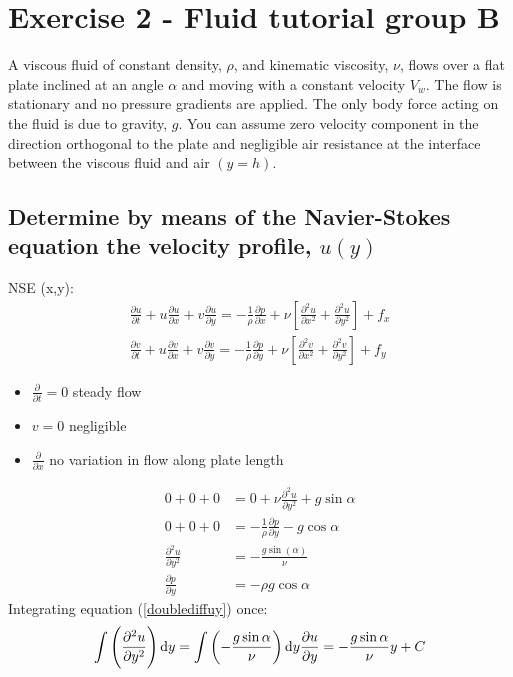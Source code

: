 \documentclass[class=report, crop=false, 12pt,a4paper]{standalone}
\begin{document}
\section{Exercise 2 - Fluid tutorial group B}
A viscous fluid of constant density, $\rho$, and kinematic viscosity, $\nu$, flows over a flat plate inclined at an angle $\alpha$ and moving with a constant velocity $V_w$. The flow is stationary and no pressure gradients are applied. The only body force acting on the fluid is due to gravity, $g$. You can assume zero velocity component in the direction orthogonal to the plate and negligible air resistance at the interface between the viscous fluid and air $(y = h)$.
\subsection{Determine by means of the Navier-Stokes equation the velocity profile, $u(y)$}
NSE (x,y):
\begin{gather}
  \frac{\partial u}{\partial t} + u \frac{\partial u}{\partial x} + v\frac{\partial u}{\partial y} = -\frac{1}{\rho}\frac{\partial p}{\partial x} +\nu \left[ \frac{\partial^2 u}{\partial x^2} +\frac{\partial^2 u}{\partial y^2} \right] + f_x\\
  \frac{\partial v}{\partial t} + u \frac{\partial v}{\partial x} + v\frac{\partial v}{\partial y} = -\frac{1}{\rho} \frac{\partial p}{\partial y} +\nu \left[ \frac{\partial^2 v}{\partial x^2} +\frac{\partial^2 v}{\partial y^2} \right] + f_y
\end{gather}
\begin{itemize}
  \item $\frac{\partial}{\partial t} = 0 $ steady flow
  \item $v=0$ negligible
  \item $\frac{\partial}{\partial x}$ no variation in flow along plate length
\end{itemize}
\begin{align}
  0 + 0 + 0 &= 0 + \nu \frac{\partial^2 u}{\partial y^2} + g\sin{\alpha}\\
  0+0+0 &= -\frac{1}{\rho}\frac{\partial p}{\partial y} -g\cos{\alpha}\\
  \frac{\partial^2 u }{\partial y^2} &= -\frac{g \sin(\alpha)}{\nu} \label{doublediffuy}\\
  \frac{\partial p}{\partial y} &= - \rho g \cos{\alpha}
\end{align}
Integrating equation (\ref{doublediffuy}) once:
\begin{equation}
  \int \left( \frac{\partial^2 u}{\partial y^2} \right) \dif y = \int \left( -\frac{g\sin{\alpha}}{\nu} \right)\dif y \\
  \frac{\partial u}{\partial y} = -\frac{g\sin{\alpha}}{\nu}y + C
\end{equation}
\end{document}
